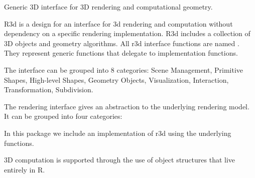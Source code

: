 \documentclass{article}
\begin{document}
\begin{Description}\relax
Generic 3D interface for 3D rendering and computational geometry.
\end{Description}
\begin{Details}\relax
R3d is a design for an interface for 3d rendering and computation without dependency
on a specific rendering implementation. R3d includes a collection
of 3D objects and geometry algorithms.
All r3d interface functions are named .  They represent generic functions that delegate 
to implementation functions.

The interface can be grouped into 8 categories: Scene Management, Primitive Shapes,
High-level Shapes, Geometry Objects, Visualization, Interaction, Transformation,
Subdivision.  

The rendering interface gives an abstraction to the underlying rendering model. It can
be grouped into four categories:    

In this package we include an implementation of r3d using the underlying  functions.

3D computation is supported through the use of object structures that live entirely in R.


\end{Details}
\end{document}
